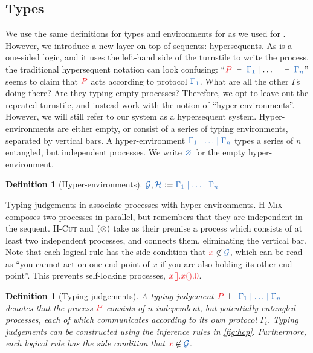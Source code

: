 \documentclass[submission,copyright,creativecommons]{eptcs}
\newtheorem{definition}[lemma]{Definition}
\begin{document}
\subsection{Types}
We use the same definitions for types and environments for \hcp as we used for \cp. However, we introduce a new layer on top of sequents: hypersequents. As \cp is a one-sided logic, and it uses the left-hand side of the turnstile to write the process, the traditional hypersequent notation can look confusing: ``$\seq[P]{\Gamma_1}\hsep\dots\hsep\seq{\Gamma_n}$'' seems to claim that $\tm{P}$ acts according to protocol $\ty{\Gamma_1}$. What are all the other $\Gamma$s doing there? Are they typing empty processes? Therefore, we opt to leave out the repeated turnstile, and instead work with the notion of ``hyper-environments''. However, we will still refer to our system as a hypersequent system. Hyper-environments are either empty, or consist of a series of typing environments, separated by vertical bars. A hyper-environment $\ty{\Gamma_1 \hsep \dots \hsep \Gamma_n}$ types a series of $n$ entangled, but independent processes. We write $\ty{\emptyhypercontext}$ for the empty hyper-environment.
\begin{definition}[Hyper-environments]\label{def:hcp-hyper-environment}
  $\ty{\mathcal{G}}, \ty{\mathcal{H}} := \ty{\Gamma_1 \hsep \dots \hsep \Gamma_n}$
\end{definition}\noindent
Typing judgements in \hcp associate processes with hyper-environments. \textsc{H-Mix} composes two processes in parallel, but remembers that they are independent in the sequent. \textsc{H-Cut} and $(\otimes)$ take as their premise a process which consists of at least two independent processes, and connects them, eliminating the vertical bar. Note that each logical rule has the side condition that $\tm{x} \not\in \ty{\mathcal{G}}$, which can be read as ``you cannot act on one end-point of $x$ if you are also holding its other end-point''. This prevents self-locking processes, \eg $\tm{\piBoundSend{x}{}{\piRecv{x}{}{\piHalt}}}$.
\begin{definition}[Typing judgements]\label{def:hcp}
  A typing judgement $\seq[P]{\Gamma_1 \hsep \dots \hsep \Gamma_n}$ denotes that the process $\tm{P}$ consists of $n$ independent, but potentially entangled processes, each of which communicates according to its own protocol $\Gamma_i$. 
  Typing judgements can be constructed using the inference rules in
  \cref{fig:hcp}.
  Furthermore, each logical rule has the side condition that $\tm{x} \not\in \ty{\mathcal{G}}$.
\end{definition}\noindent
\end{document}
